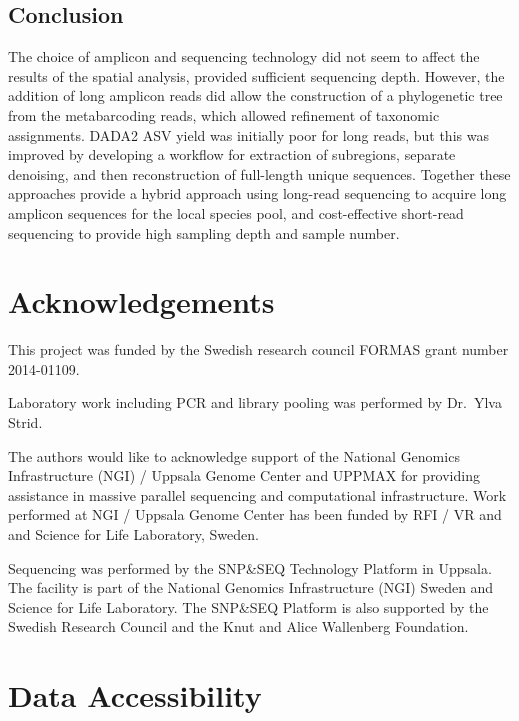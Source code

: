 \documentclass[
  12pt,
]{article}
\begin{document}
\hypertarget{conclusion}{%
\subsection{Conclusion}\label{conclusion}}

The choice of amplicon and sequencing technology did not seem to affect the results of the spatial analysis, provided sufficient sequencing depth.
However, the addition of long amplicon reads did allow the construction of a phylogenetic tree from the metabarcoding reads, which allowed refinement of taxonomic assignments.
DADA2 ASV yield was initially poor for long reads, but this was improved by developing a workflow for extraction of subregions, separate denoising, and then reconstruction of full-length unique sequences.
Together these approaches provide a hybrid approach using long-read sequencing to acquire long amplicon sequences for the local species pool, and cost-effective short-read sequencing to provide high sampling depth and sample number.

\hypertarget{acknowledgements}{%
\section*{Acknowledgements}\label{acknowledgements}}

This project was funded by the Swedish research council FORMAS grant number 2014-01109.

Laboratory work including PCR and library pooling was performed by Dr.~Ylva Strid.

The authors would like to acknowledge support of the National Genomics Infrastructure (NGI) / Uppsala Genome Center and UPPMAX for providing assistance in massive parallel sequencing and computational infrastructure.
Work performed at NGI / Uppsala Genome Center has been funded by RFI / VR and and Science for Life Laboratory, Sweden.

Sequencing was performed by the SNP\&SEQ Technology Platform in Uppsala.
The facility is part of the National Genomics Infrastructure (NGI) Sweden and Science for Life Laboratory.
The SNP\&SEQ Platform is also supported by the Swedish Research Council and the Knut and Alice Wallenberg Foundation.

\singlespacing

\printbibliography

\doublespacing

\hypertarget{data-accessibility}{%
\section*{Data Accessibility}\label{data-accessibility}}
\end{document}
